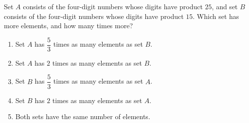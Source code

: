 Set $A$ consists of the four-digit numbers whose digits have product $25$, and set $B$ consists of the four-digit numbers whose digits have product $15$. Which set has more elements, and how many times more?
\begin{enumerate}
\item[(A)] Set $A$ has $\dfrac53$ times as many elements as set $B$.
\item[(B)] Set $A$ has $2$ times as many elements as set $B$.
\item[(C)] Set $B$ has $\dfrac53$ times as many elements as set $A$.
\item[(D)] Set $B$ has $2$ times as many elements as set $A$.
\item[(E)] Both sets have the same number of elements.
\end{enumerate}
